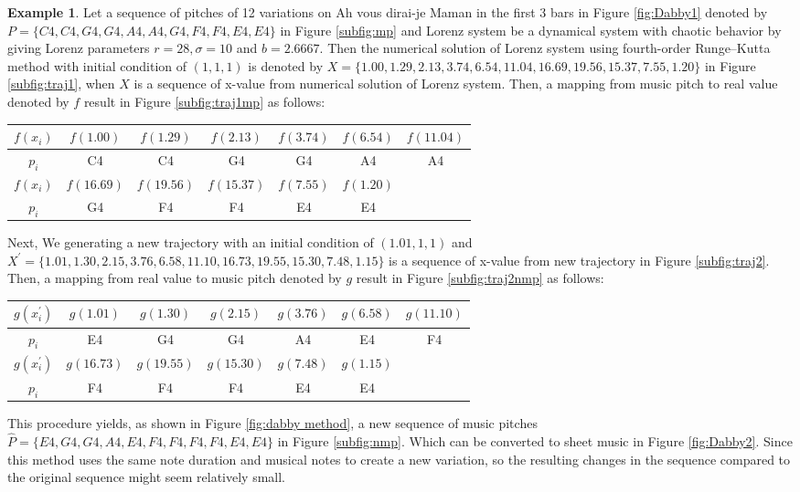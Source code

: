\documentclass[11pt]{article}
\theoremstyle{definition}
\newtheorem{example}[theorem]{Example}
\begin{document}
\begin{example}
Let a sequence of pitches of 12 variations on Ah vous dirai-je Maman \cite{hinson_12_1987} in the first 3 bars in Figure \ref{fig:Dabby1} denoted by $P = \{C4, C4, G4, G4, A4, A4, G4, F4, F4, E4, E4 \}$ in Figure \ref{subfig:mp} and Lorenz system be a dynamical system with chaotic behavior by giving Lorenz parameters $r = 28, \sigma=10$ and $b = 2.6667 $. Then the numerical solution of Lorenz system using fourth-order Runge–Kutta method \cite{bose_numerical_2019} with initial condition of $(1,1,1)$ is denoted by $X = \{1.00, 1.29, 2.13, 3.74, 6.54, 11.04, 16.69, 19.56, 15.37, 7.55, 1.20\}$ in Figure \ref{subfig:traj1}, when $X$ is a sequence of x-value from numerical solution of Lorenz system. Then, a mapping from music pitch to real value denoted by $f$ result in Figure \ref{subfig:traj1mp} as follows:

\begin{center}
\begin{tabular}{|c||c|c|c|c|c|c|}
\hline
$f(x_i)$ & $f(1.00)$ & $f(1.29)$ & $f(2.13)$ & $f(3.74)$ & $f(6.54)$ & $f(11.04)$ \\
\hline
$p_i$ & C4 & C4 & G4 & G4 & A4 & A4 \\
\hline
$f(x_i)$ & $f(16.69)$ & $f(19.56)$ & $f(15.37)$ & $f(7.55)$ & $f(1.20)$ & \\
\hline
$p_i$ & G4 & F4 & F4 & E4 & E4 &  \\
\hline
\end{tabular}
\end{center}

Next, We generating a new trajectory with an initial condition of $(1.01,1,1)$ and $X^\prime = \{ 1.01, 1.30, 2.15, 3.76, 6.58, 11.10, 16.73, 19.55, 15.30, 7.48, 1.15 \} $ is a sequence of x-value from new trajectory in Figure \ref{subfig:traj2}. Then, a mapping from real value to music pitch denoted by $g$ result in Figure \ref{subfig:traj2nmp} as follows:

\begin{center}
\begin{tabular}{|c||c|c|c|c|c|c|}
\hline
$g(x^\prime_i)$ & $g(1.01)$ & $g(1.30)$ & $g(2.15)$ & $g(3.76)$ & $g(6.58)$ & $g(11.10)$ \\
\hline
$p_i$ & E4 & G4 & G4 & A4 & E4 & F4 \\
\hline
$g(x^\prime_i)$ & $g(16.73)$ & $g(19.55)$ & $g(15.30)$ & $g(7.48)$ & $g(1.15)$ & \\
\hline
$p_i$ & F4 & F4 & F4 & E4 & E4 &  \\
\hline
\end{tabular}
\end{center}
This procedure yields, as shown in Figure \ref{fig:dabby method}, a new sequence of music pitches \\ $\hat{P} =\{E4, G4, G4, A4, E4, F4, F4, F4, F4, E4, E4 \}$ in Figure \ref{subfig:nmp}. Which can be converted to sheet music in Figure \ref{fig:Dabby2}. Since this method uses the same note duration and musical notes to create a new variation, so the resulting changes in the sequence compared to the original sequence might seem relatively small.
\end{example}
\end{document}
